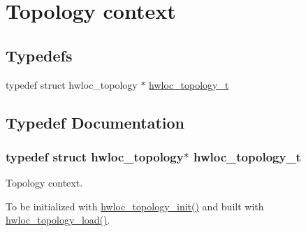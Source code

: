 \hypertarget{a00039}{
\section{Topology context}
\label{a00039}
}
\subsection*{Typedefs}
\begin{DoxyCompactItemize}
\item 
typedef struct hwloc\_\-topology $\ast$ \hyperlink{a00039_ga9d1e76ee15a7dee158b786c30b6a6e38}{hwloc\_\-topology\_\-t}
\end{DoxyCompactItemize}


\subsection{Typedef Documentation}
\hypertarget{a00039_ga9d1e76ee15a7dee158b786c30b6a6e38}{
\subsubsection[{hwloc\_\-topology\_\-t}]{\setlength{\rightskip}{0pt plus 5cm}typedef struct hwloc\_\-topology$\ast$ {\bf hwloc\_\-topology\_\-t}}}
\label{a00039_ga9d1e76ee15a7dee158b786c30b6a6e38}


Topology context. 

To be initialized with \hyperlink{a00043_ga5c2d6f476af87005c7bd0811d4548b9f}{hwloc\_\-topology\_\-init()} and built with \hyperlink{a00043_ga91e2e6427b95fb7339c99dbbef996e71}{hwloc\_\-topology\_\-load()}. 